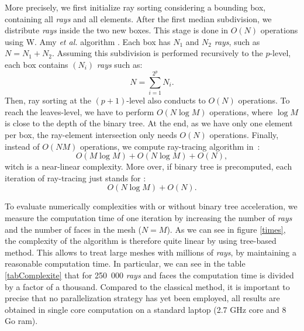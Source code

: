 \documentclass[AMA,STIX1COL]{WileyNJD-v2}
\begin{document}
More precisely, we first initialize ray sorting considering a bounding box, containing all \textit{rays} and all elements. After the first median subdivision, we distribute \textit{rays} inside the two new boxes. This stage is done in $O(N)$ operations using W. Amy \textit{et al.} algorithm \cite{AABB}. Each box has $N_1$ and $N_2$ \textit{rays}, such as $N = N_1 + N_2$. Assuming this subdivision is performed recursively to the $p$-level, each box contains $(N_i)$ \textit{rays} such as: 
\begin{equation}
N = \sum_{i=1}^{2^p} N_i.
\end{equation}  
Then, ray sorting at the $(p+1)$-level also conducts to $O(N)$ operations. To reach the leaves-level, we have to perform $O(N \log M)$ operations, where $\log M$ is close to the depth of the binary tree. At the end, as we have only one element per box, the ray-element intersection only needs $O(N)$ operations. Finally, instead of $O(N M)$ operations, we compute ray-tracing algorithm in~: 
\begin{equation}
O(M\log M) + O(N \log M) + O(N),
\end{equation}  
witch is a near-linear complexity. More over, if binary tree is precomputed, each iteration of ray-tracing just stands for :
\begin{equation}
O(N \log M) + O(N).
\end{equation}
 
To evaluate numerically complexities with or without binary tree acceleration, we measure the computation time of one iteration by increasing the number of \textit{rays} and the number of faces in the mesh ($N=M$). As we can see in figure \ref{times}, the complexity of the algorithm is therefore quite linear by using tree-based method. This allows to treat large meshes with millions of \textit{rays}, by maintaining a reasonable computation time. In particular, we can see in the table \ref{tabComplexite} that for 250~000 \textit{rays} and faces the computation time is divided by a factor of a thousand. Compared to the classical method, it is important to precise that no parallelization strategy has yet been employed, all results are obtained in single core computation on a standard laptop (2.7 GHz core and 8 Go ram).
\end{document}
